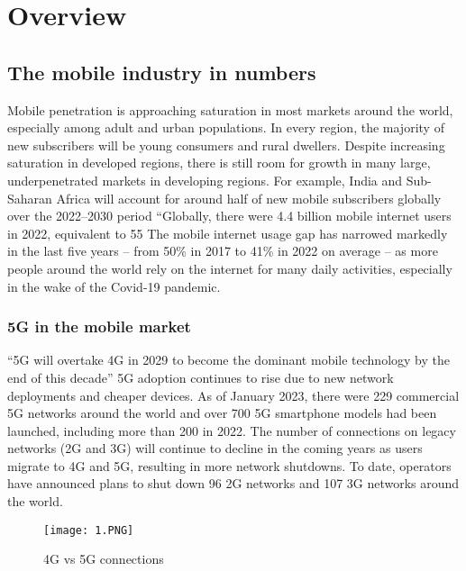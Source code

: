 \chapter{Overview}

\section{The mobile industry in numbers}
Mobile penetration is approaching saturation in most markets around the world, especially among adult and urban populations. In every region, the majority of new subscribers will be young consumers and rural dwellers.
Despite increasing saturation in developed regions, there is still room for growth in many large, underpenetrated markets in developing regions. For example, India and Sub-Saharan Africa will account for around half of new mobile subscribers globally over the 2022–2030 period
“Globally, there were 4.4 billion mobile internet users in 2022, equivalent to 55%
The mobile internet usage gap has narrowed markedly in the last five years – from 50\% in 2017 to 41\% in 2022 on average – as more people around the world rely on the internet for many daily activities, especially in the wake of the Covid-19 pandemic. 
\subsection{5G in the mobile market}
“5G will overtake 4G in 2029 to become the dominant mobile technology by the end of this decade”
5G adoption continues to rise due to new network deployments and cheaper devices. As of January 2023, there were 229 commercial 5G networks around the world and over 700 5G smartphone models had been launched, including more than 200 in 2022. 
The number of connections on legacy networks (2G and 3G) will continue to decline in the coming years as users migrate to 4G and 5G, resulting in more network shutdowns. To date, operators have announced plans to shut down 96 2G networks and 107 3G networks around the world.

\begin{figure}[h]
\centering
\texttt{[image: 1.PNG]}
\caption{4G vs 5G connections }
\label{fig:figure1.1}
\end{figure}


